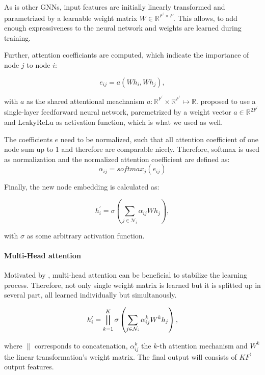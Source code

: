 As is other GNNs, input features are initially 
linearly transformed and parametrized by a learnable weight matrix $W \in \mathbb{R}^{F^{\prime} \times F}$.
This allows, to add enough expressiveness to the neural network and weights are learned during training.

Further, attention coefficiants are computed, which indicate the importance of node $j$ to node $i$:

\begin{equation}
  e_{ij} = a(Wh_i, Wh_j),
\end{equation}

with $a$ as the shared attentional meachanism $a : \mathbb{R}^{F^{\prime}} \times \mathbb{R}^{F^{\prime}} \mapsto \mathbb{R}$.
\citet{GAT} proposed to use a single-layer feedforward neural network, paremetrized by a weight vector $a \in \mathbb{R}^{2F^{\prime}}$
and LeakyReLu as activation function, which is what we used as well.
 
The coefficients $e$ need to be normalized, such that all attention coefficient of one node sum up to 1 and therefore are comparable nicely.
Therefore, softmax is used as normalization and the normalized attention coefficient are defined as:
\begin{equation}
  \alpha_{ij} = softmax_j(e_{ij})
\end{equation}


Finally, the new node embedding is calculated as:

\begin{equation}
  h_i^{\prime} = \sigma \left( \sum_{j \in \mathcal{N}_i} \alpha_{ij} W h_j \right),
\end{equation}

with $\sigma$ as some arbitrary activation function.

\paragraph{Multi-Head attention}
Motivated by \citet{transformer}, multi-head attention can be beneficial to stabilize the learning process.
Therefore, not only single weight matrix is learned but it is splitted up in several part, all learned individually but simultanously.


\begin{equation}
  h_i^{\prime} = \bigparallel^K_{k=1} \sigma \left(\sum_{j \in \mathcal{N}_i} \alpha_{ij}^k W^k h_j \right),  
\end{equation}

where $\parallel$ corresponds to concatenation, $\alpha_{ij}^k$ the $k$-th attention mechanism and $W^k$ the linear
transformation's weight matrix. The final output will consists of $KF^{\prime}$ output features.


